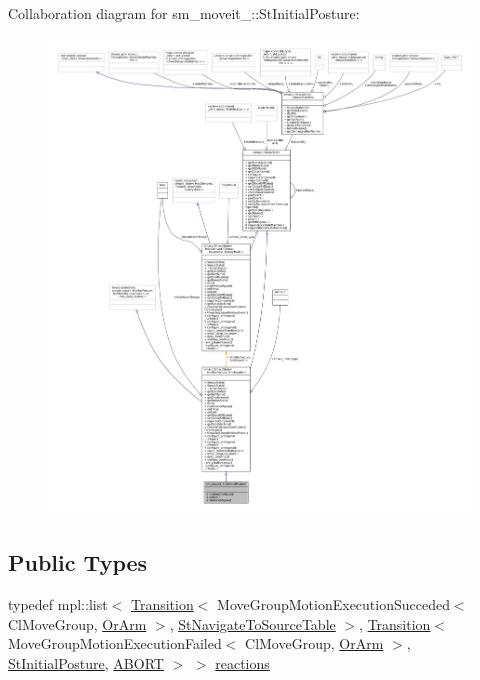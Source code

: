 Collaboration diagram for sm\+\_\+moveit\+\_\+:\+:St\+Initial\+Posture\+:
\nopagebreak
\begin{figure}[H]
\begin{center}
\leavevmode
\includegraphics[width=350pt]{structsm__moveit__4_1_1StInitialPosture__coll__graph}
\end{center}
\end{figure}
\subsection*{Public Types}
\begin{DoxyCompactItemize}
\item 
typedef mpl\+::list$<$ \hyperlink{classsmacc_1_1Transition}{Transition}$<$ Move\+Group\+Motion\+Execution\+Succeded$<$ Cl\+Move\+Group, \hyperlink{classsm__moveit__4_1_1OrArm}{Or\+Arm} $>$, \hyperlink{structsm__moveit__4_1_1StNavigateToSourceTable}{St\+Navigate\+To\+Source\+Table} $>$, \hyperlink{classsmacc_1_1Transition}{Transition}$<$ Move\+Group\+Motion\+Execution\+Failed$<$ Cl\+Move\+Group, \hyperlink{classsm__moveit__4_1_1OrArm}{Or\+Arm} $>$, \hyperlink{structsm__moveit__4_1_1StInitialPosture}{St\+Initial\+Posture}, \hyperlink{structsmacc_1_1default__transition__tags_1_1ABORT}{A\+B\+O\+RT} $>$ $>$ \hyperlink{structsm__moveit__4_1_1StInitialPosture_aba6b4f6994263b0b57c50986b9db3497}{reactions}
\end{DoxyCompactItemize}
